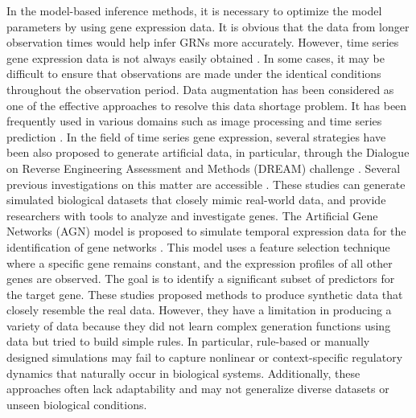 In the model-based inference methods, it is necessary to optimize the model parameters by using gene expression data. It is obvious that the data from longer observation times would help infer GRNs more accurately. However, time series gene expression data is not always easily obtained \parencite{Murphy2002}. In some cases, it may be difficult to ensure that observations are made under the identical conditions throughout the observation period. Data augmentation has been considered as one of the effective approaches to resolve this data shortage problem. It has been frequently used in various domains such as image processing \parencite{Waqas2022, FridAdar2018, Zhang2023, Shin2018} and time series prediction \parencite{Forestier2017, Maweu2021, Leznik2021}. In the field of time series gene expression, several strategies have been also proposed to generate artificial data, in particular, through the Dialogue on Reverse Engineering Assessment and Methods (DREAM) challenge \parencite{Schaffter2011, DREAM2009}. Several previous investigations on this matter are accessible \parencite{Albert2008, deJong2002, DeJong2003, Mendes2003, VanDenBulcke2006}. These studies can generate simulated biological datasets that closely mimic real-world data, and provide researchers with tools to analyze and investigate genes. The Artificial Gene Networks (AGN) model is proposed to simulate temporal expression data for the identification of gene networks \parencite{MartinsLopes2011}. This model uses a feature selection technique where a specific gene remains constant, and the expression profiles of all other genes are observed. The goal is to identify a significant subset of predictors for the target gene. These studies proposed methods to produce synthetic data that closely resemble the real data. However, they have a limitation in producing a variety of data because they did not learn complex generation functions using data but tried to build simple rules. In particular, rule-based or manually designed simulations may fail to capture nonlinear or context-specific regulatory dynamics that naturally occur in biological systems. Additionally, these approaches often lack adaptability and may not generalize diverse datasets or unseen biological conditions. \par
